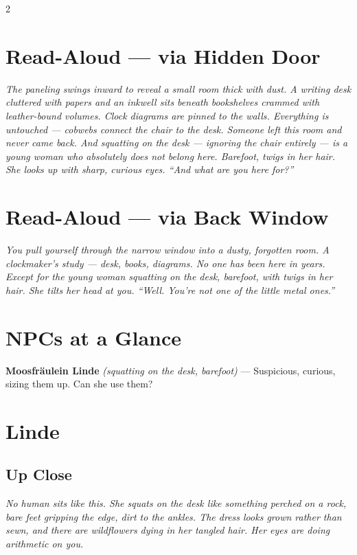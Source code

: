 \documentclass[10pt,letterpaper]{article}
\newcommand{\npc}[3]{\textbf{#1} \textit{(#2)} --- #3}
\begin{document}
\begin{multicols}{2}

\section*{Read-Aloud --- via Hidden Door}
\begin{readaloud}
\itshape
The paneling swings inward to reveal a small room thick with dust. A writing desk cluttered with papers and an inkwell sits beneath bookshelves crammed with leather-bound volumes. Clock diagrams are pinned to the walls. Everything is untouched --- cobwebs connect the chair to the desk. Someone left this room and never came back. And squatting on the desk --- ignoring the chair entirely --- is a young woman who absolutely does not belong here. Barefoot, twigs in her hair. She looks up with sharp, curious eyes. ``And what are you here for?''
\end{readaloud}

\section*{Read-Aloud --- via Back Window}
\begin{readaloud}
\itshape
You pull yourself through the narrow window into a dusty, forgotten room. A clockmaker's study --- desk, books, diagrams. No one has been here in years. Except for the young woman squatting on the desk, barefoot, with twigs in her hair. She tilts her head at you. ``Well. You're not one of the little metal ones.''
\end{readaloud}

\section*{NPCs at a Glance}

\npc{Moosfräulein Linde}{squatting on the desk, barefoot}{Suspicious, curious, sizing them up. Can she use them?}

\section*{Linde}
\subsection*{Up Close}
\begin{readaloud}
\itshape
No human sits like this. She squats on the desk like something perched on a rock, bare feet gripping the edge, dirt to the ankles. The dress looks grown rather than sewn, and there are wildflowers dying in her tangled hair. Her eyes are doing arithmetic on you.
\end{readaloud}

\end{multicols}
\end{document}
